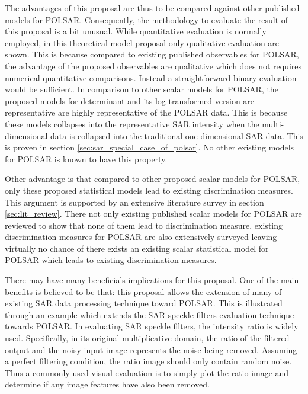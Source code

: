 \documentclass[journal,12pt,draftcls,onecolumn]{IEEEtran}
\begin{document}
The advantages of this proposal are thus to be compared against other published models for POLSAR.
Consequently, the methodology to evaluate the result of this proposal is a bit unusual.
While quantitative evaluation is normally employed, in this theoretical model proposal only qualitative evaluation are shown.
This is because compared to existing published observables for POLSAR, the advantage of the proposed observables are qualitative which does not requires numerical quantitative comparisons.
Instead a straightforward binary evaluation would be sufficient.
In comparison to other scalar models for POLSAR, the proposed models for determinant and its log-transformed version are representative are highly representative of the POLSAR data.
This is because these models collapses into the representative SAR intensity when the multi-dimensional data is collapsed into the traditional one-dimensional SAR data.
This is proven in section \ref{sec:sar_special_case_of_polsar}.
No other existing models for POLSAR is known to have this property.

Other advantage is that compared to other proposed scalar models for POLSAR, only these proposed statistical models lead to existing discrimination measures.
This argument is supported by an extensive literature survey in section \ref{sec:lit_review}.
There not only existing published scalar models for POLSAR are reviewed to show that none of them lead to discrimination measure,
  existing discrimination measures for POLSAR are also extensively surveyed leaving virtually no chance of there exists an existing scalar statistical model for POLSAR which leads to existing discrimination measures.

There may have many beneficials implications for this proposal.
One of the main benefits is believed to be that:
  this proposal allows the extension of many of existing SAR data processing technique toward POLSAR.
This is illustrated through an example which extends the SAR speckle filters evaluation technique towards POLSAR.  
In evaluating SAR speckle filters, the intensity ratio is widely used.
Specifically, in its original multiplicative domain, the ratio of the filtered output and the noisy input image represents the noise being removed.
Assuming a perfect filtering condition, the ratio image should only contain random noise.
Thus a commonly used visual evaluation is to simply plot the ratio image and determine if any image features have also been removed.
\end{document}
